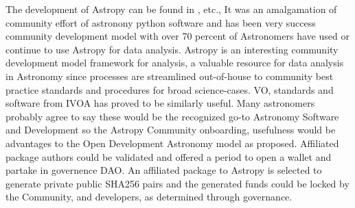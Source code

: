 \documentclass[final,5p,times,twocolumn,authoryear]{elsarticle}
\begin{document}

The development of Astropy  can be found in \cite{robitaille_astropy:_2013}, etc.,  It was an amalgamation of community effort of astronony python software and has been very success community development model with over 70 percent of Astronomers have used or continue to use Astropy for data analysis. Astropy is an interesting community development model framework for analysis,  a valuable resource for data analysis in Astronomy since processes are streamlined out-of-house to community best practice standards and procedures for broad science-cases. VO, standards and software from IVOA has proved to be similarly useful. Many astronomers probably agree to say these would be the recognized go-to  Astronomy Software and Development so the Astropy Community onboarding, usefulness would be advantages to the Open Development Astronomy model as proposed. Affiliated package authors could be validated and offered a period to open a wallet and partake in governence DAO. An affiliated package to Astropy is selected to generate private public SHA256 pairs and the generated funds could be locked by the Community, and developers, as determined through governance. 
\end{document}
